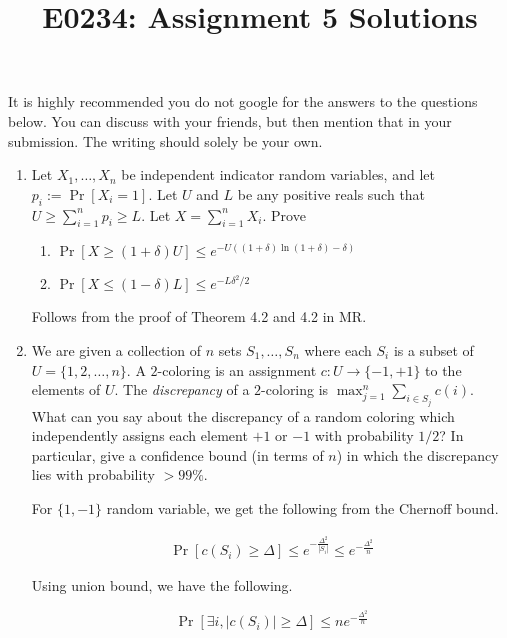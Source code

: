 \documentclass[11pt]{article}
\begin{document}
\def\Exp{\mathbf{Exp}}
\def\Var{\mathbf{Var}}
\title{E0234: Assignment 5 Solutions}
\author{}
\date{}
\maketitle
It is highly recommended you do not google for the answers to the questions below. You can discuss with your friends, but then mention that in your submission.
The writing should solely be your own.

\begin{enumerate}

\item Let $X_1,\ldots , X_n$ be independent indicator random variables, and let $p_i := \Pr[X_i = 1]$.
Let $U$ and $L$ be any positive reals such that $U \geq \sum_{i=1}^n p_i \geq L$. Let $X = \sum_{i=1}^n X_i$.
Prove
\begin{enumerate}
	\item $\Pr\left[X \geq (1+\delta)U\right] \leq e^{-U((1+\delta)\ln(1+\delta) -\delta)}$
	\item $\Pr\left[X \leq (1-\delta)L\right] \leq e^{-L\delta^2/2}$
\end{enumerate}

\Sol

Follows from the proof of Theorem 4.2 and 4.2 in MR.

\item  We are given a collection of $n$ sets $S_1,\ldots,S_n$ where each $S_i$ is a subset of $U = \{1,2,\ldots,n\}$.
A $2$-coloring is an assignment  $c:U \to \{-1,+1\}$ to the elements of $U$.
The {\em discrepancy} of a $2$-coloring is $\max_{j=1}^n \sum_{i\in S_j} c(i)$. 
What can you say about the discrepancy of a random 
coloring which independently assigns each element $+1$ or $-1$ with probability $1/2$? 
In particular, give a confidence bound (in terms of $n$) in which the discrepancy lies with probability $> 99\%$.

\Sol

For $\{1, -1\}$ random variable, we get the following from the Chernoff bound.

\begin{align*}
 \Pr[c(S_i) \ge \Delta] \le  e^{-\frac{\Delta^2}{|S_i|}} \le  e^{-\frac{\Delta^2}{n}}
\end{align*}

Using union bound, we have the following.

\[ \Pr[\exists i, |c(S_i)| \ge \Delta] \le n e^{-\frac{\Delta^2}{n}}\]


\end{enumerate}
\end{document}
